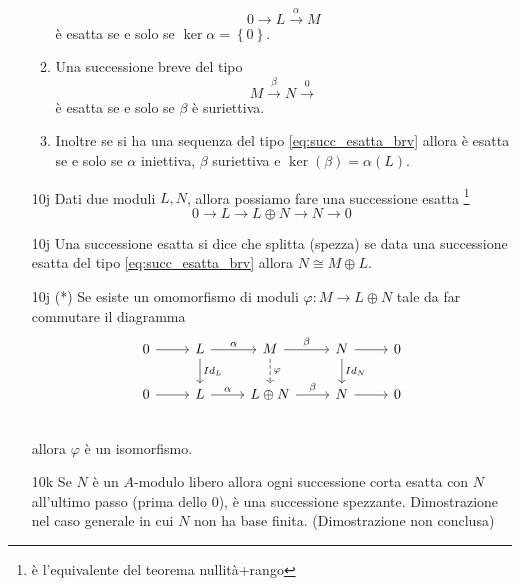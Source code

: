 \documentclass[italian]{article}
\begin{document}
\begin{enumerate}
\begin{enumerate}
            \begin{equation*}
              0 \to L \xrightarrow{\alpha} M
            \end{equation*}
            è esatta se e solo se $\ker{\alpha} = \left\{ 0 \right\}$.
          \item Una successione breve del tipo 
            \begin{equation*}
              M \xrightarrow{\beta} N \xrightarrow 0
            \end{equation*}
            è esatta se e solo se $\beta$ è suriettiva.
          \item Inoltre se si ha una sequenza del tipo
            \eqref{eq:succ_esatta_brv} allora è esatta se e solo se $\alpha$
            iniettiva, $\beta$ suriettiva e $\ker(\beta) = \alpha(L)$.
        \end{enumerate}
      \item[10j] Dati due moduli $L, N$, allora possiamo fare una successione
        esatta \footnote{è l'equivalente del teorema nullità+rango}
        \begin{equation*}
          0 \to L \to L \oplus N \to N \to 0
        \end{equation*}
      \item[10j] Una successione esatta si dice che splitta (spezza) se data una
        successione esatta del tipo \eqref{eq:succ_esatta_brv} allora $N \cong
        M \oplus L$.
      \item[10j] (*) Se esiste un omomorfismo di moduli $\varphi \colon M \to L \oplus N$ 
        tale da far commutare il diagramma 
        \begin{equation*}
        \begin{tikzcd}
        	0 \arrow{r} & L \arrow{r}{\alpha} \arrow{d}{Id_L} & M \arrow{r}{\beta}
        	\arrow[dashed]{d}{\varphi} & N \arrow{r} \arrow{d}{Id_N} & 0 \\
        	0 \arrow{r} & L \arrow{r}{\alpha} & L \oplus N \arrow{r}{\beta} 
        	& N \arrow{r} & 0 \\
        \end{tikzcd}	
        \end{equation*}
        allora $\varphi$ è un isomorfismo.
      \item[10k] Se $N$ è un $A$-modulo libero allora ogni successione corta
        esatta con $N$ all'ultimo passo (prima dello $0$), è una successione
        spezzante. Dimostrazione nel caso generale in cui $N$ non ha base
        finita. (Dimostrazione non conclusa) 

\end{enumerate}
\end{document}
